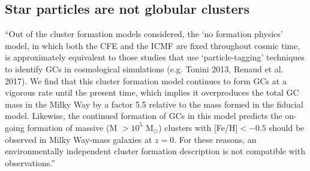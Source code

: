 \documentclass[a4paper,fleqn,usenatbib]{mnras}
\newcommand{\Sun}[0]{\ensuremath{_{\odot}}}
\begin{document}
\subsection{Star particles are not globular clusters}
\label{sec:discussion_mass_excess}
% 

\citet{2019MNRAS.486.5838R}
``Out of the cluster formation models considered, the `no formation physics' model,
in which both the CFE and the ICMF are fixed throughout cosmic time, is
approximately equivalent to those studies  that  use  `particle-tagging'
techniques  to  identify  GCs  in cosmological simulations (e.g. Tonini 2013,
Renaud et al. 2017). We find that this cluster formation model continues to form GCs
at a vigorous rate until the present time, which implies it overproduces
the total GC mass in the Milky Way by a factor
5.5 relative to the mass formed in the fiducial model. Likewise, the continued
formation  of  GCs  in  this  model  predicts  the  on-going  formation
of massive (M $>10^5$ M\Sun) clusters with [Fe/H]$ <-0.5$ should be observed in
Milky Way-mass galaxies at $z=0$. For these reasons, an environmentally independent
cluster formation description is not compatible with observations.''
\end{document}
